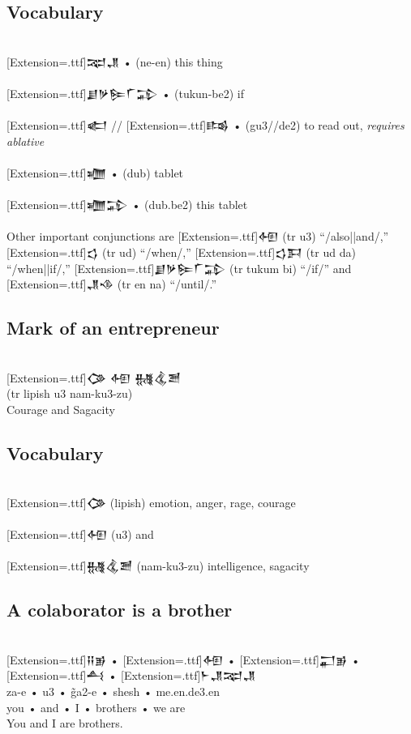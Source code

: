 \documentclass[a4paper,12pt]{book}
\newcommand{\fcn}{\setmainfont{Akkadian}[Extension=.ttf]}
\newcommand{\fsm}{\Large\setmainfont{Akkadian}[Extension=.ttf]}
\begin{document}
\subsection*{Vocabulary}

\verb||\\
{\fsm 𒉈𒂗} • (ne-en) this thing\\
\verb||\\
{\fsm 𒋗𒃻𒌉𒇲𒁉} • (tukun-be2) if\\
\verb||\\
{\fsm 𒅗} // {\fsm 𒌤} • (gu3//de2) to read out,
     {\em requires ablative}\\
\verb||\\
{\fsm 𒁾} • (dub) tablet\\
\verb||\\
{\fsm 𒁾𒁉} • (dub.be2) this tablet\\

\verb||\\
Other important conjunctions
are {\fcn 𒅇} (tr u3) ``/also||and/,''
{\fcn 𒌓} (tr ud) ``/when/,''
{\fcn 𒌓𒁕}  (tr ud da) ``/when||if/,''
{\fcn 𒋗𒃻𒌉𒇲𒁉} (tr tukum bi) ``/if/''
and {\fcn 𒂗𒈾}  (tr en na)  ``/until/.''

\newpage
\subsection*{Mark of an entrepreneur}
\verb||\\
{\fsm 𒀚 𒅇 𒉆𒆬𒍪}\\
(tr lipish u3 nam-ku3-zu)\\
Courage and Sagacity\\

\subsection*{Vocabulary}
\verb||\\
{\fsm 𒀚}  (lipish) emotion, anger, rage, courage\\
\verb||\\
{\fsm 𒅇}  (u3) and\\
\verb||\\
{\fsm 𒉆𒆬𒍪}  (nam-ku3-zu) intelligence, sagacity\\

\subsection*{A colaborator is a brother}
\verb||\\
{\fsm 𒍝𒂊} • {\fsm 𒅇} • {\fsm 𒂷𒂊} • {\fsm 𒋀} • {\fsm 𒈨𒂗𒉈𒂗}\\
za-e • u3 • g̃a2-e • shesh • me.en.de3.en\\
you • and • I • brothers • we are\\
You and I are brothers.\\
\end{document}
